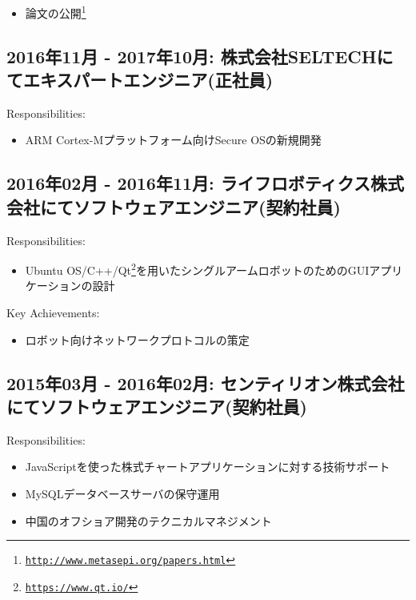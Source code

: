 \documentclass[letterpaper]{article}
\begin{document}
\begin{itemize}
  \item 論文の公開\footnote{\href{http://www.metasepi.org/papers.html}{\tt http://www.metasepi.org/papers.html}}
\end{itemize}

\subsection*{2016年11月 - 2017年10月: 株式会社SELTECHにてエキスパートエンジニア(正社員)}

Responsibilities:

\begin{itemize}
  \item ARM Cortex-Mプラットフォーム向けSecure OSの新規開発
\end{itemize}

\subsection*{2016年02月 - 2016年11月: ライフロボティクス株式会社にてソフトウェアエンジニア(契約社員)}

Responsibilities:

\begin{itemize}
  \item Ubuntu OS/C++/Qt\footnote{\href{https://www.qt.io/}{\tt https://www.qt.io/}}を用いたシングルアームロボットのためのGUIアプリケーションの設計
\end{itemize}

Key Achievements:

\begin{itemize}
  \item ロボット向けネットワークプロトコルの策定
\end{itemize}

\subsection*{2015年03月 - 2016年02月: センティリオン株式会社にてソフトウェアエンジニア(契約社員)}

Responsibilities:

\begin{itemize}
  \item JavaScriptを使った株式チャートアプリケーションに対する技術サポート
  \item MySQLデータベースサーバの保守運用
  \item 中国のオフショア開発のテクニカルマネジメント
\end{itemize}
\end{document}
